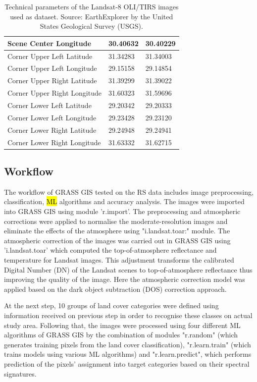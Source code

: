 \documentclass[final,5p,times,twocolumn]{elsarticle}
\numberwithin{table}{section}
\begin{document}
\begin{table}[t]
{\begin{tabular}{|l|l|l|}
        Scene Center Longitude & 30.40632 & 30.40229 \\ \hline
        Corner Upper Left Latitude & 31.34283 & 31.34003 \\ \hline
        Corner Upper Left Longitude & 29.15158 & 29.14854 \\ \hline
        Corner Upper Right Latitude & 31.39299 & 31.39022 \\ \hline
        Corner Upper Right Longitude & 31.60323 & 31.59696 \\ \hline
        Corner Lower Left Latitude & 29.20342 & 29.20333 \\ \hline
        Corner Lower Left Longitude & 29.23428 & 29.23120 \\ \hline
        Corner Lower Right Latitude & 29.24948 & 29.24941 \\ \hline
        Corner Lower Right Longitude & 31.63332 & 31.62715 \\ \hline
    \end{tabular}
    \caption{Technical parameters of the Landsat-8 OLI/TIRS images used as dataset. Source: EarthExplorer by the United States Geological Survey (USGS).}\label{tab01}
    }
\end{table}

\subsection{Workflow}

The workflow of GRASS GIS tested on the RS data includes image preprocessing, classification, \hl{ML} algorithms and accuracy analysis. The images were imported into GRASS GIS using module 'r.import'. The preprocessing and atmospheric corrections were applied to normalise the moderate-resolution images and eliminate the effects of the atmosphere using "i.landsat.toar:" module. The atmospheric correction of the images was carried out in GRASS GIS using 'i.landsat.toar' which computed the top-of-atmosphere reflectance and temperature for Landsat images. This adjustment transforms the calibrated Digital Number (DN) of the Landsat scenes to top-of-atmosphere reflectance thus improving the quality of the image. Here the atmospheric correction model was applied based on the dark object subtraction (DOS) correction approach.

At the next step, 10 groups of land cover categories were defined using information received on previous step in order to recognise these classes on actual study area. Following that, the images were processed using four different ML algorithms of GRASS GIS by the combination of modules "r.random" (which generates training pixels from the land cover classification), "r.learn.train" (which trains models using various ML algorithms) and "r.learn.predict", which performs prediction of the pixels' assignment into target categories based on their spectral signatures.
\end{document}
